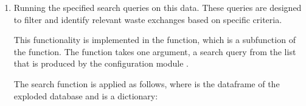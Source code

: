\documentclass[letterpaper,10pt,english]{sphinxmanual}
\begin{document}
\begin{sphinxVerbatim}[commandchars=\\\{\}]
     
  
\end{sphinxVerbatim}
\begin{enumerate}
%
\setcounter{enumi}{1}
\item {} 
\sphinxAtStartPar
Running the specified search queries on this data. These queries are designed to filter and identify
relevant waste exchanges based on specific criteria.

\sphinxAtStartPar
This functionality is implemented in the  function, which is a subfunction of the  function.
The  function takes one argument, a search query from the list that is produced by the configuration module .

\sphinxAtStartPar
The search function is applied as follows, where  is the dataframe of the exploded database and  is a dictionary:

\end{enumerate}
\end{document}
